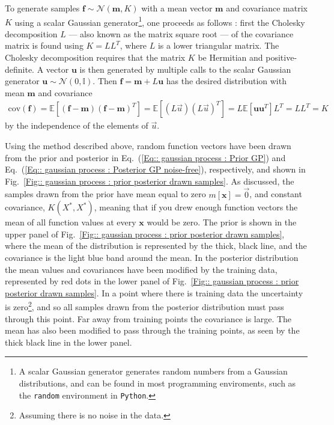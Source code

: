 \documentclass[twoside,english]{uiofysmaster}
\begin{document}
{{To generate samples $\textbf{f} \sim \mathcal{N}(\textbf{m}, K)$ with a mean vector $\textbf{m}$ and covariance matrix $K$ using a scalar Gaussian generator\footnote{A scalar Gaussian generator generates random numbers from a Gaussian distributions, and can be found in most programming enviroments, such as the \verb|random| environment in \verb|Python|.}, one proceeds as follows \cite{rasmussen2006gaussian}: first the Cholesky decomposition $L$ --- also known as the matrix square root ---  of the covariance matrix is found using $K = LL^T$, where $L$ is a lower triangular matrix. The Cholesky decomposition requires that the matrix $K$ be Hermitian and positive-definite.  A vector $\textbf{u}$ is then generated by multiple calls to the scalar Gaussian generator $\textbf{u} \sim \mathcal{N}(0, \mathbb{I})$. Then $\textbf{f} = \textbf{m} + L \textbf{u}$ has the desired distribution with mean $\textbf{m}$ and covariance
\begin{align}
\mathrm{cov}(\textbf{f}) = \mathbb{E}[(\textbf{f} - \textbf{m})(\textbf{f} - \textbf{m})^T] = \mathbb{E}[(L \vec{u})(L \vec{u})^T] = L \mathbb{E} [\textbf{u} \textbf{u}^T]L^T = LL^T = K
\end{align}
by the independence of the elements of $\vec{u}$.

Using the method described above, random function vectors have been drawn from the prior and posterior in Eq.~(\ref{Eq:: gaussian process : Prior GP}) and Eq.~(\ref{Eq:: gaussian process : Posterior GP noise-free}), respectively, and shown in Fig.~\ref{Fig:: gaussian process : prior posterior drawn samples}. As discussed, the samples drawn from the prior have mean equal to zero $m[\textbf{x}]=\vec{0}$, and constant covariance, $K(X^*, X^*)$, meaning that if you drew enough function vectors the mean of all function values at every $\textbf{x}$ would be zero. The prior is shown in the upper panel of Fig.~\ref{Fig:: gaussian process : prior posterior drawn samples}, where the mean of the distribution is represented by the thick, black line, and the covariance is the light blue band around the mean. In the posterior distribution the mean values and covariances have been modified by the training data, represented by red dots in the lower panel of Fig.~\ref{Fig:: gaussian process : prior posterior drawn samples}. In a point where there is training data the uncertainty is zero\footnote{Assuming there is no noise in the data.}, and so all samples drawn from the posterior distribution must pass through this point. Far away from training points the covariance is large. The mean has also been modified to pass through the training points, as seen by the thick black line in the lower panel.

}}
\end{document}
